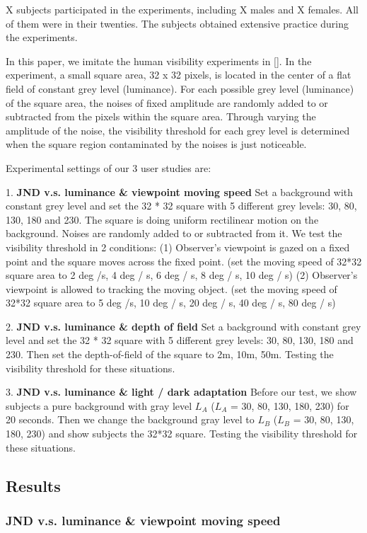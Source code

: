 X subjects participated in the experiments, including X males and X females. All of them were in their twenties. The subjects obtained extensive practice during the experiments.

In this paper, we imitate the human visibility experiments in []. In the experiment, a small square area, 32 x 32 pixels, is located in the center of a flat field of constant grey level (luminance). For each possible grey level (luminance) of the square area, the noises of fixed amplitude are randomly added to or subtracted from the pixels within the square area. Through varying the amplitude of the noise, the visibility threshold for each grey level is determined when the square region contaminated by the noises is just noticeable. 

Experimental settings of our 3 user studies are:

1. \textbf{JND v.s. luminance \& viewpoint moving speed} Set a background with constant grey level and set the 32 * 32 square with 5 different grey levels: 30, 80, 130, 180 and 230. The square is doing uniform rectilinear motion on the background. Noises are randomly added to or subtracted from it. We test the visibility threshold in 2 conditions: (1) Observer's viewpoint is gazed on a fixed point and the square moves across the fixed point. (set the moving speed of 32*32 square area to 2 deg /s, 4 deg / s, 6 deg / s, 8 deg / s, 10 deg / s) (2) Observer's viewpoint is allowed to tracking the moving object. (set the moving speed of 32*32 square area to 5 deg /s, 10 deg / s, 20 deg / s, 40 deg / s, 80 deg / s)

2. \textbf{JND v.s. luminance \& depth of field} Set a background with constant grey level and set the 32 * 32 square with 5 different grey levels: 30, 80, 130, 180 and 230. Then set the depth-of-field of the square to 2m, 10m, 50m. Testing the visibility threshold for these situations.

3. \textbf{JND v.s. luminance \& light / dark adaptation} Before our test, we show subjects a pure background with gray level $L_A$ ($L_A$ = 30, 80, 130, 180, 230) for 20 seconds. Then we change the background gray level to $L_B$ ($L_B$ = 30, 80, 130, 180, 230) and show subjects the 32*32 square. Testing the visibility threshold for these situations.

\subsection{Results}

\subsubsection{JND v.s. luminance \& viewpoint moving speed}

